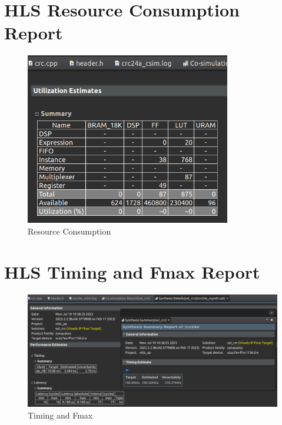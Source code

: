 \documentclass{article}
\begin{document}
\section{HLS Resource Consumption Report}
\vspace{1cm}
\begin{figure}[h]
\centering
\includegraphics[width=0.8\textwidth]{figs/p11.png}
    \caption{Resource Consumption}
    \label{fig:my_label}
\end{figure}

\vspace{12cm}


\section{HLS Timing and Fmax Report}
\vspace{1cm}
\begin{figure}[h]
    \centering
\includegraphics[width=1.1\textwidth]{figs/p12.png}
    \caption{Timing and Fmax}
    \label{fig:my_label}
\end{figure}

\vspace{1cm}
\end{document}
